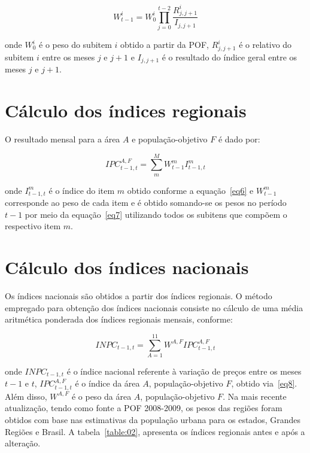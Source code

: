 {\begin{equation}\label{eq7}
{W}_{t-1}^{i}={W}_{0}^{i}\prod_{j=0}^{t-2}{\frac{{R}_{j,j+1}^{i}}{{I}_{j,j+1}}} 
\end{equation}

\noindent onde ${W}_{0}^{i}$ é o peso do subitem $i$ obtido a partir da POF, ${R}_{j,j+1}^{i}$ é o relativo do subitem $i$ entre os meses $j$ e $j+1$ e ${I}_{j,j+1}$ é o resultado do índice geral entre os meses $j$ e $j+1$.

\section*{Cálculo dos índices regionais}

O resultado mensal para a área $A$ e população-objetivo $F$ é dado por:

\begin{equation}\label{eq8}
{IPC}_{t-1,t}^{A,F}=\sum_{m}^{M}{{W}_{t-1}^{m}{I}_{t-1,t}^{m}} 
\end{equation}

\noindent onde ${I}_{t-1,t}^{m}$ é o índice do item $m$ obtido conforme a equação~\ref{eq6} e ${W}_{t-1}^{m}$ corresponde ao peso de cada item e é obtido somando-se os pesos no período $t-1$ por meio da equação~\ref{eq7} utilizando todos os subitens que compõem o respectivo item $m$.

\section*{Cálculo dos índices nacionais}

Os índices nacionais são obtidos a partir dos índices regionais. O método empregado para obtenção dos índices nacionais consiste no cálculo de uma média aritmética ponderada dos índices regionais mensais, conforme:

\begin{equation}\label{eq9}
{INPC}_{t-1,t}=\sum_{A=1}^{11}{{W}^{A,F}{IPC}_{t-1,t}^{A,F}}
\end{equation}

\noindent onde ${INPC}_{t-1,t}$ é o índice nacional referente à variação de preços entre os meses $t-1$ e $t$, ${IPC}_{t-1,t}^{A,F}$ é o índice da área $A$, população-objetivo $F$, obtido via~\ref{eq8}. Além disso, ${W}^{A,F}$ é o peso da área $A$, população-objetivo $F$. Na mais recente atualização, tendo como fonte a POF 2008-2009, os pesos das regiões foram obtidos com base nas estimativas da população urbana para os estados, Grandes Regiões e Brasil. A tabela~\ref{table:02}, apresenta os índices regionais antes e após a alteração. 

}
